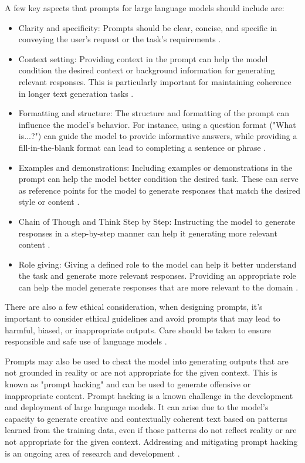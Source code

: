 A few key aspects that prompts for large language models should include are:
\begin{itemize}
    \item Clarity and specificity: Prompts should be clear, concise, and specific in conveying the user's request or the task's requirements \cite{}.
    \item Context setting: Providing context in the prompt can help the model condition the desired context or background information for generating relevant responses. This is particularly important for maintaining coherence in longer text generation tasks \cite{}.
    \item Formatting and structure: The structure and formatting of the prompt can influence the model's behavior. For instance, using a question format ("What is...?") can guide the model to provide informative answers, while providing a fill-in-the-blank format can lead to completing a sentence or phrase \cite{gao2023prompt}.
    \item Examples and demonstrations: Including examples or demonstrations in the prompt can help the model better condition the desired task. These can serve as reference points for the model to generate responses that match the desired style or content \cite{brown2020language, gao2023prompt}.
    \item Chain of Though and Think Step by Step: Instructing the model to generate responses in a step-by-step manner can help it generating more relevant content \cite{wei2023chainofthought}.
    \item Role giving: Giving a defined role to the model can help it better understand the task and generate more relevant responses. Providing an appropriate role can help the model generate responses that are more relevant to the domain \cite{prompt-learn}.
\end{itemize}

There are also a few ethical consideration, when designing prompts, it's important to consider ethical guidelines and avoid prompts that may lead to harmful, biased, or inappropriate outputs. Care should be taken to ensure responsible and safe use of language models \cite{li2023ethics,kasneci2023chatgpt}.

Prompts may also be used to cheat the model into generating outputs that are not grounded in reality or are not appropriate for the given context. This is known as "prompt hacking" and can be used to generate offensive or inappropriate content. Prompt hacking is a known challenge in the development and deployment of large language models. It can arise due to the model's capacity to generate creative and contextually coherent text based on patterns learned from the training data, even if those patterns do not reflect reality or are not appropriate for the given context. Addressing and mitigating prompt hacking is an ongoing area of research and development \cite{greshake2023more,secretsydney,ignore-all-previous-instructions}.